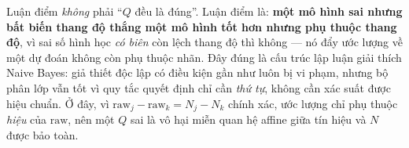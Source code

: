 \documentclass[11pt]{article}
\begin{document}
\vspace{1.0em}
\noindent\normalsize
Luận điểm \emph{không} phải ``$Q$ đều là đúng''. Luận điểm là: \textbf{một mô
hình sai nhưng bất biến thang độ thắng một mô hình tốt hơn nhưng phụ thuộc
thang độ}, vì sai số hình học \emph{có biên} còn lệch thang độ thì không ---
nó đẩy ước lượng về một dự đoán không còn phụ thuộc nhãn. Đây đúng là cấu
trúc lập luận giải thích Naive Bayes: giả thiết độc lập có điều kiện gần như
luôn bị vi phạm, nhưng bộ phân lớp vẫn tốt vì quy tắc quyết định chỉ cần
\emph{thứ tự}, không cần xác suất được hiệu chuẩn. Ở đây, vì
$\text{raw}_j-\text{raw}_k = N_j-N_k$ chính xác, ước lượng chỉ phụ thuộc
\emph{hiệu} của $\text{raw}$, nên một $Q$ sai là vô hại miễn quan hệ affine
giữa tín hiệu và $N$ được bảo toàn.
\end{document}
